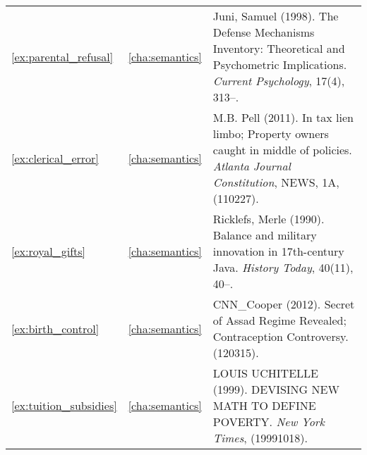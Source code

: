 \begin{longtable}{lcp{8.5cm}}
\ref{ex:parental_refusal}&\ref{cha:semantics}&Juni, Samuel (1998). The Defense Mechanisms Inventory: Theoretical and Psychometric Implications. \emph{Current Psychology}, 17(4), 313--.\\
\ref{ex:clerical_error}&\ref{cha:semantics}&M.B. Pell (2011). In tax lien limbo; Property owners caught in middle of policies. \emph{Atlanta Journal Constitution}, NEWS, 1A, (110227).\\
\ref{ex:royal_gifts}&\ref{cha:semantics}&Ricklefs, Merle (1990). Balance and military innovation in 17th-century Java. \emph{History Today}, 40(11), 40--.\\
\ref{ex:birth_control}&\ref{cha:semantics}&CNN\_Cooper (2012). Secret of Assad Regime Revealed; Contraception Controversy. (120315).\\
\ref{ex:tuition_subsidies}&\ref{cha:semantics}&LOUIS UCHITELLE (1999). DEVISING NEW MATH TO DEFINE POVERTY. \emph{New York Times}, (19991018).\\

\end{longtable}
